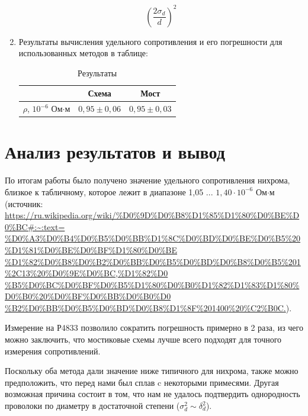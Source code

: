 \documentclass[12pt]{article}
\begin{document}
\begin{enumerate}
\[{        \left(\frac{2\sigma_d}{d}\right)^2}
    \]
    \item Результаты вычисления удельного сопротивления и его погрешности для использованных методов в таблице:
    \begin{table}[H]
        \caption{Результаты}
        \begin{tabular}{|c|c|c|}
        \hline
                                    & Схема         & Мост          \\ \hline
        $\rho$, $10^{-6}$ Ом$\cdot$м & $0,95\pm0,06$ & $0,95\pm0,03$ \\ \hline
        \end{tabular}
    \end{table}
    \end{enumerate}
    
    \section{Анализ результатов и вывод}
    \par По итогам работы было получено значение удельного сопротивления нихрома, близкое к табличному, которое лежит в
    диапазоне 1,05 ... $1,40\cdot10^{-6}$ Ом$\cdot$м (источник: 
    \url{https://ru.wikipedia.org/wiki/%
    \par Измерение на Р4833 позволило сократить погрешность примерно в 2 раза, из чего можно заключить, что
    мостиковые схемы лучше всего подходят для точного измерения сопротивлений.
    \par Поскольку оба метода дали значение ниже типичного для нихрома, также можно предположить, что перед нами
    был сплав c некоторыми примесями. Другая возможная причина состоит в том, что нам не удалось подтвердить
    однородность проволоки по диаметру в достаточной степени ($\sigma_d^2 \sim \delta_d^2$).
\end{document}
